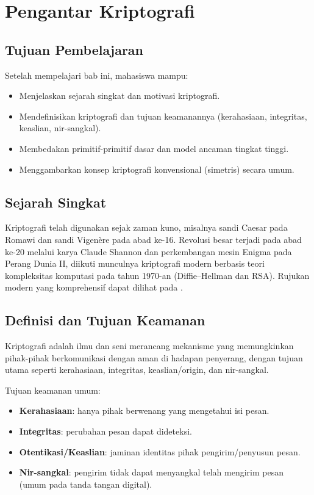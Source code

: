 \documentclass[../main.tex]{subfiles}
\begin{document}
\chapter{Pengantar Kriptografi}

\section{Tujuan Pembelajaran}
Setelah mempelajari bab ini, mahasiswa mampu:
\begin{itemize}
  \item Menjelaskan sejarah singkat dan motivasi kriptografi.
  \item Mendefinisikan kriptografi dan tujuan keamanannya (kerahasiaan, integritas, keaslian, nir-sangkal).
  \item Membedakan primitif-primitif dasar dan model ancaman tingkat tinggi.
  \item Menggambarkan konsep kriptografi konvensional (simetris) secara umum.
\end{itemize}

\section{Sejarah Singkat}
Kriptografi telah digunakan sejak zaman kuno, misalnya sandi Caesar pada Romawi dan sandi Vigen\`{e}re pada abad ke-16. Revolusi besar terjadi pada abad ke-20 melalui karya Claude Shannon dan perkembangan mesin Enigma pada Perang Dunia II, diikuti munculnya kriptografi modern berbasis teori kompleksitas komputasi pada tahun 1970-an (Diffie--Hellman dan RSA). Rujukan modern yang komprehensif dapat dilihat pada \citep{stallings,katzlindell,menezes}.

\section{Definisi dan Tujuan Keamanan}
\begin{definition}[Kriptografi]
Kriptografi adalah ilmu dan seni merancang mekanisme yang memungkinkan pihak-pihak berkomunikasi dengan aman di hadapan penyerang, dengan tujuan utama seperti kerahasiaan, integritas, keaslian/origin, dan nir-sangkal.
\end{definition}

Tujuan keamanan umum:
\begin{itemize}
  \item \textbf{Kerahasiaan}: hanya pihak berwenang yang mengetahui isi pesan.
  \item \textbf{Integritas}: perubahan pesan dapat dideteksi.
  \item \textbf{Otentikasi/Keaslian}: jaminan identitas pihak pengirim/penyusun pesan.
  \item \textbf{Nir-sangkal}: pengirim tidak dapat menyangkal telah mengirim pesan (umum pada tanda tangan digital).
\end{itemize}
\end{document}
